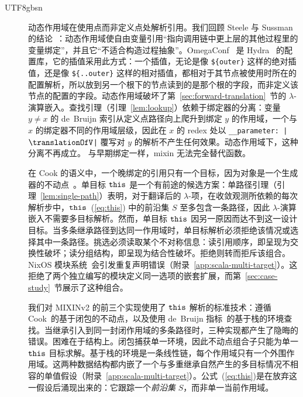\begin{CJK*}{UTF8}{gbsn}
\begin{description}
  \item[]
    动态作用域在使用点而非定义点处解析引用。我们回顾 Steele 与 Sussman 的结论~\cite{steele1978-art-of-the-interpreter}：动态作用域使自由变量引用“指向调用链中更上层的其他过程里的变量绑定”，并且它“不适合构造过程抽象”。OmegaConf~\cite{yadan2018-omegaconf} 是 Hydra~\cite{yadan2023-hydra} 的配置库，它的插值采用此方式：一个插值，无论是像 \texttt{\$\{outer\}} 这样的绝对插值，还是像 \texttt{\$\{..outer\}} 这样的相对插值，都相对于其节点被使用时所在的配置解析，所以放到另一个根下的节点读到的是那个根的字段，而非定义该节点的配置的字段。动态作用域破坏了第~\ref{sec:forward-translation}~节的 $\lambda$-演算嵌入。查找引理（引理~\ref{lem:lookup}）依赖于绑定器的分离：变量 $y \neq x$ 的 de~Bruijn 索引从定义点路径向上爬升到绑定 $y$ 的作用域，一个与 $x$ 的绑定器不同的作用域层级，因此在 $x$ 的 redex 处以 \texttt{__parameter: |$\translationOfV$|} 覆写对 $y$ 的解析不产生任何效果。动态作用域下，这种分离不再成立。
    与早期绑定一样，mixin 无法完全替代函数。

  \item[]
    在 Cook 的语义中，一个晚绑定的引用只有一个目标，因为对象是一个生成器的不动点~\cite{cook1989-denotational-inheritance}。单目标 $\mathtt{this}$ 是一个有前途的候选方案：单路径引理（引理~\ref{lem:single-path}）表明，对于翻译后的 $\lambda$-项，在收敛观测所依赖的每次解析步中，$\mathtt{this}$~(\ref{eq:this}) 中的前沿集 $S$ 至多包含一条路径，因此 $\lambda$-演算嵌入不需要多目标解析。然而，单目标 $\mathtt{this}$ 因另一原因而达不到这一设计目标。当多条继承路径到达同一作用域时，单目标解析必须拒绝该情况或选择其中一条路径。挑选必须读取某个不对称信息：读引用顺序，即呈现为交换性破坏；读分组结构，即呈现为结合性破坏。拒绝则转而拒斥该组合。NixOS 模块系统~\cite{nixos-contributors-nixos-modules}会引发重复声明错误（附录~\ref{app:scala-multi-target}）。这拒绝了两个独立编写的模块定义同一选项的嵌套扩展，而第~\ref{sec:case-study}~节展示了这种组合。

    我们对 MIXINv2 的前三个实现使用了 $\mathtt{this}$ 解析的标准技术：遵循 Cook~\cite{cook1989-denotational-inheritance}的基于闭包的不动点，以及使用 de~Bruijn 指标~\cite{debruijn1972-nameless-dummies}的基于栈的环境查找。当继承引入到同一封闭作用域的多条路径时，三种实现都产生了隐晦的错误。困难在于结构上。闭包捕获单一环境，因此不动点组合子只能为单一 $\mathtt{this}$ 目标求解。基于栈的环境是一条线性链，每个作用域只有一个外围作用域。这两种数据结构都内嵌了一个与多重继承自然产生的多目标情况不相容的单值假设（附录~\ref{app:scala-multi-target}）。公式~(\ref{eq:this})是在放弃这一假设后涌现出来的：它跟踪一个\emph{前沿集} $S$，而非单一当前作用域。
\end{description}


\end{CJK*}

